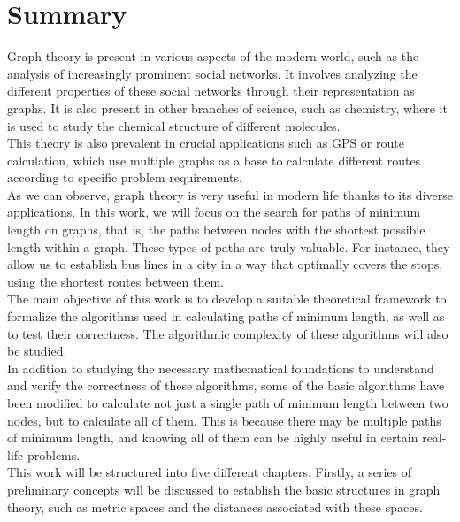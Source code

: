 %

\chapter{Summary}

Graph theory is present in various aspects of the modern world, such as the analysis of increasingly prominent social networks. It involves analyzing the different properties of these social networks through their representation as graphs. It is also present in other branches of science, such as chemistry, where it is used to study the chemical structure of different molecules. \\

This theory is also prevalent in crucial applications such as GPS or route calculation, which use multiple graphs as a base to calculate different routes according to specific problem requirements. \\ 

As we can observe, graph theory is very useful in modern life thanks to its diverse applications. In this work, we will focus on the search for paths of minimum length on graphs, that is, the paths between nodes with the shortest possible length within a graph. These types of paths are truly valuable. For instance, they allow us to establish bus lines in a city in a way that optimally covers the stops, using the shortest routes between them. \\

The main objective of this work is to develop a suitable theoretical framework to formalize the algorithms used in calculating paths of minimum length, as well as to test their correctness. The algorithmic complexity of these algorithms will also be studied. \\

In addition to studying the necessary mathematical foundations to understand and verify the correctness of these algorithms, some of the basic algorithms have been modified to calculate not just a single path of minimum length between two nodes, but to calculate all of them. This is because there may be multiple paths of minimum length, and knowing all of them can be highly useful in certain real-life problems. \\

This work will be structured into five different chapters. Firstly, a series of preliminary concepts will be discussed to establish the basic structures in graph theory, such as metric spaces and the distances associated with these spaces. \\

